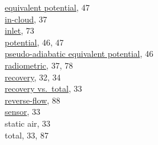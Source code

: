 \documentclass[
]{article}
\begin{document}
\hspace*{0.333em}\hspace*{0.333em}\href{./4-the-state-of-the-atmosphere.html\#thetae}{equivalent
potential}, 47\\
\hspace*{0.333em}\hspace*{0.333em}\href{./4-the-state-of-the-atmosphere.html\#AT-ITR}{in-cloud},
37\\
\hspace*{0.333em}\hspace*{0.333em}\href{./7-aerosol-particle-measurements.html\#cntemp}{inlet},
73\\
\hspace*{0.333em}\hspace*{0.333em}\href{./4-the-state-of-the-atmosphere.html\#theta}{potential},
46, 47\\
\hspace*{0.333em}\hspace*{0.333em}\href{./4-the-state-of-the-atmosphere.html\#thetae}{pseudo-adiabatic
equivalent potential}, 46\\
\hspace*{0.333em}\hspace*{0.333em}\href{./4-the-state-of-the-atmosphere.html\#AT-ITR}{radiometric},
37, 78\\
\hspace*{0.333em}\hspace*{0.333em}\href{./4-the-state-of-the-atmosphere.html\#recovery-t}{recovery},
32, 34\\
\hspace*{0.333em}\hspace*{0.333em}\href{./4-the-state-of-the-atmosphere.html\#recovery-t}{recovery
vs.~total}, 33\\
\hspace*{0.333em}\hspace*{0.333em}\href{./10-obsolete-variables.html\#ttrf}{reverse-flow},
88\\
\hspace*{0.333em}\hspace*{0.333em}\href{./4-the-state-of-the-atmosphere.html\#recovery-t}{sensor},
33\\
\hspace*{0.333em}\hspace*{0.333em}static air, 33\\
\hspace*{0.333em}\hspace*{0.333em}total, 33, 87\\
\end{document}
